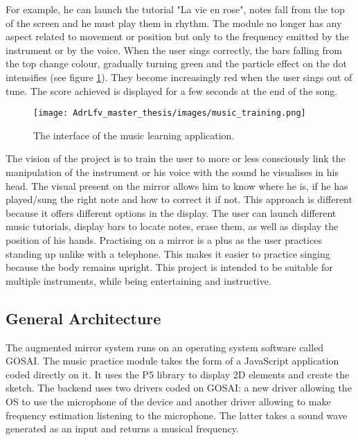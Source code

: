 For example, he can launch the tutorial "La vie en rose", notes fall from the top of the screen and he must play them in rhythm. The module no longer has any aspect related to movement or position but only to the frequency emitted by the instrument or by the voice.
When the user sings correctly, the bars falling from the top change colour, gradually turning green and the particle effect on the dot intensifies (see figure \ref{fig:music_training}). They become increasingly red when the user sings out of tune. The score achieved is displayed for a few seconds at the end of the song.

\begin{figure}[h]
    \centering
    \texttt{[image: AdrLfv\_master\_thesis/images/music\_training.png]}
    \caption{The interface of the music learning application.}
    \label{fig:music_training}
\end{figure}

The vision of the project is to train the user to more or less consciously link the manipulation of the instrument or his voice with the sound he visualises in his head. The visual present on the mirror allows him to know where he is, if he has played/sung the right note and how to correct it if not.
This approach is different because it offers different options in the display. The user can launch different music tutorials, display bars to locate notes, erase them, as well as display the position of his hands.
Practising on a mirror is a plus as the user practices standing up unlike with a telephone. This makes it easier to practice singing because the body remains upright. This project is intended to be suitable for multiple instruments, while being entertaining and instructive.

\subsection{General Architecture}

The augmented mirror system runs on an operating system software called GOSAI. The music practice module takes the form of a JavaScript application coded directly on it. It uses the P5 library to display 2D elements and create the sketch. The backend uses two drivers coded on GOSAI: a new driver allowing the OS to use the microphone of the device and another driver allowing to make frequency estimation listening to the microphone. The latter takes a sound wave generated as an input and returns a musical frequency.

